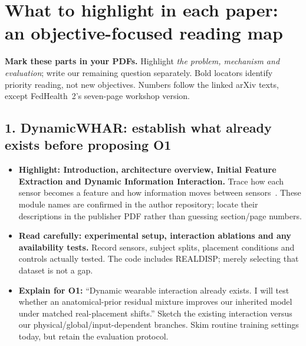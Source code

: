 \documentclass[10pt]{article}
\begin{document}
\clearpage
\begingroup
{}
\section*{What to highlight in each paper: an objective-focused reading map}
\textbf{Mark these parts in your PDFs.} Highlight \emph{the problem, mechanism and evaluation}; write our remaining question separately. Bold locators identify priority reading, not new objectives. Numbers follow the linked arXiv texts, except FedHealth~2's seven-page workshop version.

\subsection*{1. DynamicWHAR: establish what already exists before proposing O1}
\begin{itemize}
\item \textbf{Highlight: Introduction, architecture overview, Initial Feature Extraction and Dynamic Information Interaction.} Trace how each sensor becomes a feature and how information moves between sensors~\cite{omdynamic}. These module names are confirmed in the author repository; locate their descriptions in the publisher PDF rather than guessing section/page numbers.
\item \textbf{Read carefully: experimental setup, interaction ablations and any availability tests.} Record sensors, subject splits, placement conditions and controls actually tested. The code includes REALDISP; merely selecting that dataset is not a gap.
\item \textbf{Explain for O1:} ``Dynamic wearable interaction already exists. I will test whether an anatomical-prior residual mixture improves our inherited model under matched real-placement shifts.'' Sketch the existing interaction versus our physical/global/input-dependent branches. Skim routine training settings today, but retain the evaluation protocol.
\end{itemize}
\end{document}

